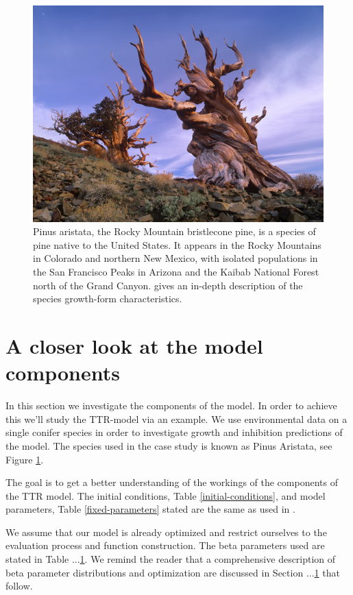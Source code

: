\documentclass[paper=a4, fontsize=11pt]{scrartcl}
\numberwithin{equation}{section}		%
\numberwithin{figure}{section}			%
\numberwithin{table}{section}				%
\begin{document}
\newpage
\begin{figure}[h]
\centering
\includegraphics[scale=2]{bristlecone-pine-1.jpg}
\caption{Pinus aristata, the Rocky Mountain bristlecone pine, is a species of pine native to the United States. It appears in the Rocky Mountains in Colorado and northern New Mexico, with isolated populations in the San Francisco Peaks in Arizona and the Kaibab National Forest north of the Grand Canyon. \cite{2006Growth-FormReport} gives an  in-depth description of the species growth-form characteristics.} 
\label{pinus aristata}
\end{figure}

\section{A closer look at the model components}

In this section we investigate the components of the model. In order to achieve this we'll study the TTR-model via an example. We use environmental data on a single conifer species in order to investigate growth and inhibition predictions of the model. The species used in the case study is known as Pinus Aristata, see Figure \ref{pinus aristata}. 

The goal is to get a better understanding of the workings of the components of the TTR model. The initial conditions, Table \ref{initial-conditions}, and model parameters, Table \ref{fixed-parameters} stated are the same as used in \cite{Higgins2012APlants}. 

We assume that our model is already optimized and restrict ourselves to the evaluation process and function construction. The beta parameters used are stated in Table ...\ref{}. We remind the reader that a comprehensive description of beta parameter distributions and optimization are discussed in Section ...\ref{} that follow. 
\end{document}
